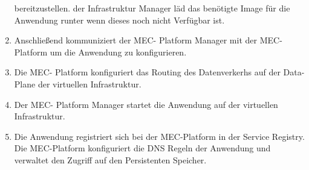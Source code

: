 \documentclass[runningheads]{llncs}
\numberwithin{figure}{section}
\begin{document}
\begin{enumerate}
  bereitzustellen. der Infrastruktur Manager läd das benötigte Image für die Anwendung runter wenn dieses noch nicht Verfügbar ist.
  \item Anschließend kommuniziert der MEC- Platform Manager mit der MEC- Platform um die Anwendung zu konfigurieren.
  \item Die MEC- Platform konfiguriert das Routing des Datenverkerhs auf der Data-Plane der virtuellen Infrastruktur.
  \item Der MEC- Platform Manager startet die Anwendung auf der virtuellen Infrastruktur.
  \item Die Anwendung registriert sich bei der MEC-Platform in der Service Registry. Die MEC-Platform konfiguriert die DNS Regeln der 
  Anwendung und verwaltet den Zugriff auf den Persistenten Speicher.
\end{enumerate}

\newpage
\end{document}

